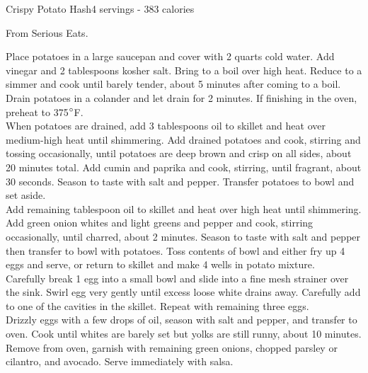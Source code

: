 \begin{recipe}{Crispy Potato Hash}{4 servings - 383 calories}{}

\freeform From Serious Eats.


Place potatoes in a large saucepan and cover with 2 quarts cold water. Add vinegar and 2 tablespoons kosher salt. Bring to a boil over high heat. Reduce to a simmer and cook until barely tender, about 5 minutes after coming to a boil. Drain potatoes in a colander and let drain for 2 minutes. If finishing in the oven, preheat to 375$\degree$F.\\

When potatoes are drained, add 3 tablespoons oil to skillet and heat over medium-high heat until shimmering. Add drained potatoes and cook, stirring and tossing occasionally, until potatoes are deep brown and crisp on all sides, about 20 minutes total. Add cumin and paprika and cook, stirring, until fragrant, about 30 seconds. Season to taste with salt and pepper. Transfer potatoes to bowl and set aside.\\

Add remaining tablespoon oil to skillet and heat over high heat until shimmering. Add green onion whites and light greens and pepper and cook, stirring occasionally, until charred, about 2 minutes. Season to taste with salt and pepper then transfer to bowl with potatoes. Toss contents of bowl and either fry up 4 eggs and serve, or return to skillet and make 4 wells in potato mixture.\\

Carefully break 1 egg into a small bowl and slide into a fine mesh strainer over the sink. Swirl egg very gently until excess loose white drains away. Carefully add to one of the cavities in the skillet. Repeat with remaining three eggs.\\

Drizzly eggs with a few drops of oil, season with salt and pepper, and transfer to oven. Cook until whites are barely set but yolks are still runny, about 10 minutes. Remove from oven, garnish with remaining green onions, chopped parsley or cilantro, and avocado. Serve immediately with salsa.\\



\end{recipe}